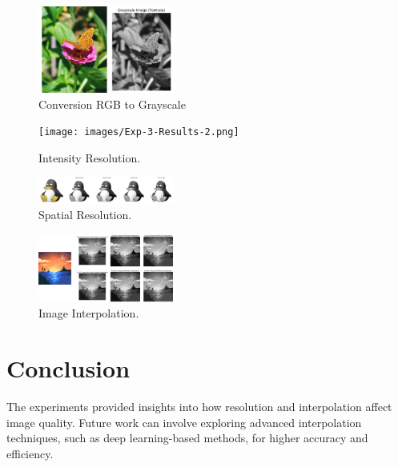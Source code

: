 \documentclass{report}
\begin{document}
\begin{figure}[h!]
    \centering
    \includegraphics[width=0.4\textwidth]{images/Exp-3-Results-1.png} %
    \caption{Conversion RGB to Grayscale}
    \label{fig:exp-3-results}
\end{figure}

\begin{figure}[h!]
    \centering
    \texttt{[image: images/Exp-3-Results-2.png]} %
    \caption{Intensity Resolution.}
    \label{fig:exp-3-results}
\end{figure}

\begin{figure}[h!]
    \centering
    \includegraphics[width=0.4\textwidth]{images/Exp-3-Results-3.png} %
    \caption{Spatial Resolution.}
    \label{fig:exp-3-results}
\end{figure}

\begin{figure}[h!]
    \centering
    \includegraphics[width=0.4\textwidth]{images/Exp-3-Results-4.png} %
    \caption{Image Interpolation.}
    \label{fig:exp-3-results}
\end{figure}

\section{Conclusion}
The experiments provided insights into how resolution and interpolation affect image quality. Future work can involve exploring advanced interpolation techniques, such as deep learning-based methods, for higher accuracy and efficiency.
\end{document}
